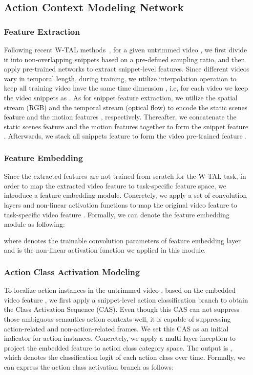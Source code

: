 \documentclass[journal,comsoc]{IEEEtran}
\begin{document}
\subsection{Action Context Modeling Network}
\subsubsection{Feature Extraction}
\par Following recent W-TAL methods~\cite{WTALC, AUTOLOC, BASNet, A2CLPT}, for a given untrimmed video , we first divide it into non-overlapping snippets based on a pre-defined sampling ratio, and then apply pre-trained networks to extract snippet-level features. Since different videos vary in temporal length, during training, we utilize interpolation operation to keep all training video have the same time dimension , i.e, for each video we keep the video snippets as . As for snippet  feature extraction, we utilize the spatial stream (RGB) and the temporal stream (optical flow) to encode the static scenes feature  and the motion features , respectively. Thereafter, we concatenate the static scenes feature  and the motion features  together to form the snippet feature . Afterwards, we stack all snippets feature to form the video pre-trained feature .

\subsubsection{Feature Embedding}
\par Since the extracted features  are not trained from scratch for the W-TAL task, in order to map the extracted video feature  to task-specific feature space, we introduce a feature embedding module. Concretely, we apply a set of convolution layers and non-linear activation functions to map the original video feature  to task-specific video feature . Formally, we can denote the feature embedding module as following:

where  denotes the trainable convolution parameters of feature embedding layer and  is the non-linear activation function we applied in this module.

\subsubsection{Action Class Activation Modeling}
\par To localize action instances in the untrimmed video , based on the embedded video feature , we first apply a snippet-level action classification branch to obtain the Class Activation Sequence (CAS). Even though this CAS can not suppress those ambiguous semantics action contexts well, it is capable of suppressing action-related and non-action-related frames. We set this CAS as an initial indicator for action instances.  Concretely, we apply a multi-layer inception to project the embedded feature to action class category space. The output is , which denotes the classification logit of each action class over time.  Formally, we can express the action class activation branch as follows:
\end{document}
